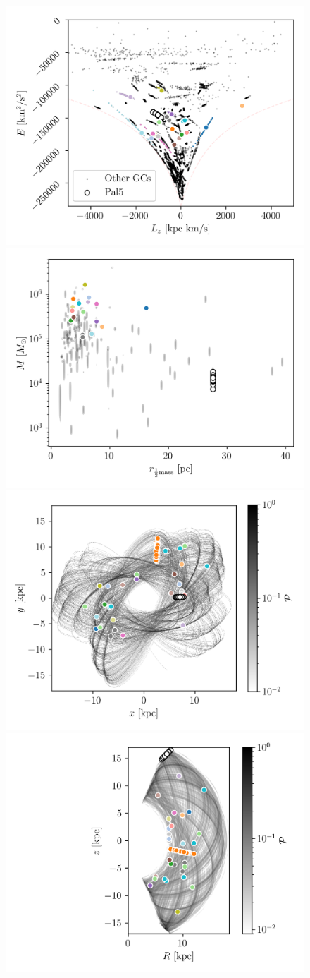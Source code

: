 \documentclass{aa}
\begin{document}
    \begin{figure}
      \centering
      \includegraphics[width=0.45\linewidth]{E_Lz_perturbers.png}
      \includegraphics[width=0.45\linewidth]{mass_size_plane.png}
      \includegraphics[width=0.45\linewidth]{impact_stats_phase_space_xy.png}
      \includegraphics[width=0.45\linewidth]{impact_stats_phase_space.png}

\end{figure}
\end{document}
